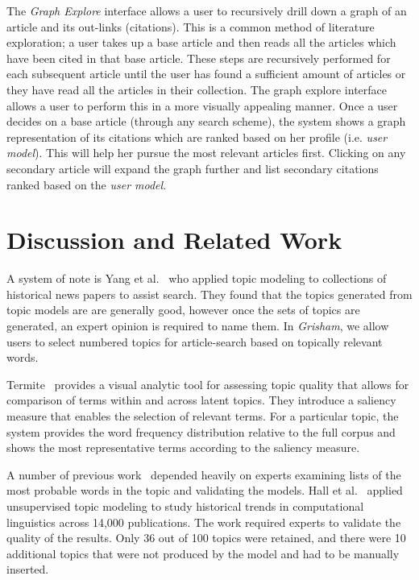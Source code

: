 \documentclass[letterpaper]{article}
\newcommand{\system}{\textsl{Grisham}\xspace}
\begin{document}
The \textsl{Graph Explore} interface allows a user to recursively 
drill down a graph of an article and its out-links (citations).
This is a common method of literature exploration; a user takes up a base article and then reads all the articles which have been cited in that base article.
These steps are recursively performed for each subsequent article until the user has found a sufficient amount of articles or they have read all the articles in their collection.
The graph explore interface allows a user to perform this in a more visually appealing manner.
Once a user decides on a base article (through any search scheme), the system shows a graph representation of its citations which are ranked based on her profile (i.e. \textsl{user model}).
This will help her pursue the most relevant articles first.
Clicking on any secondary article will expand the graph further and 
list secondary citations ranked based on the \textsl{user model}.




\section{Discussion and Related Work}
\label{sec:discussion}

A system of note is Yang et al.~\cite{yang2011topic} who applied topic modeling to 
collections of historical news papers to assist search. They 
found that the topics generated from topic models are 
are generally good, however once the sets of topics are 
generated, an expert opinion is required to name them. 
In \system, we allow users to select numbered topics for article-search 
based on topically relevant words.


Termite~\cite{2012-termite} provides a visual analytic tool for assessing topic
quality that allows for comparison of terms within and across latent topics.
They introduce a saliency measure that enables the selection of relevant terms.
For a particular topic, the system provides the word frequency distribution
relative to the full corpus and shows the most representative terms according
to the saliency measure.

A number of previous
work~\cite{chang2009reading,mimno2011optimizing,newman2010evaluating} depended
heavily on experts examining lists of the most probable words in the topic and
validating the models. Hall et al.~\cite{hall2008studying} applied unsupervised
topic modeling to study historical trends in computational linguistics across
14,000 publications. The work required experts  to validate the quality of the
results. Only 36 out of 100 topics were retained, and there were 10 additional
topics that were not produced by the model and had to be manually inserted.
\end{document}
